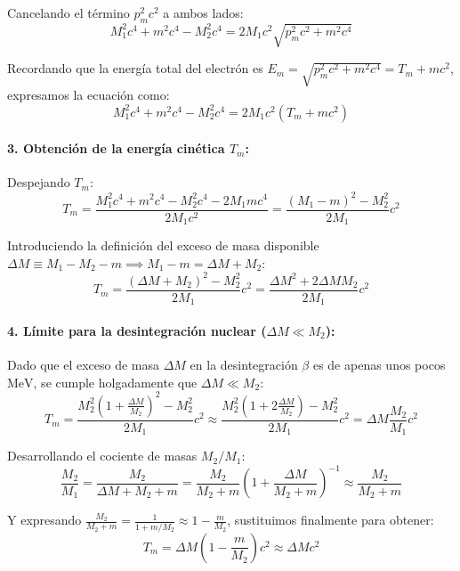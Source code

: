 Cancelando el término $p_m^2 c^2$ a ambos lados:
\begin{equation}
M_1^2 c^4 + m^2 c^4 - M_2^2 c^4 = 2 M_1 c^2 \sqrt{p_m^2 c^2 + m^2 c^4}
\end{equation}

Recordando que la energía total del electrón es $E_m = \sqrt{p_m^2 c^2 + m^2 c^4} = T_m + m c^2$, expresamos la ecuación como:
\begin{equation}
M_1^2 c^4 + m^2 c^4 - M_2^2 c^4 = 2 M_1 c^2 (T_m + m c^2)
\end{equation}

\paragraph{3. Obtención de la energía cinética $T_m$:}
Despejando $T_m$:
\begin{equation}
T_m = \frac{M_1^2 c^4 + m^2 c^4 - M_2^2 c^4 - 2 M_1 m c^4}{2 M_1 c^2} = \frac{(M_1 - m)^2 - M_2^2}{2 M_1} c^2
\end{equation}

Introduciendo la definición del exceso de masa disponible $\Delta M \equiv M_1 - M_2 - m \implies M_1 - m = \Delta M + M_2$:
\begin{equation}
T_m = \frac{(\Delta M + M_2)^2 - M_2^2}{2 M_1} c^2 = \frac{\Delta M^2 + 2 \Delta M M_2}{2 M_1} c^2
\end{equation}

\paragraph{4. Límite para la desintegración nuclear ($\Delta M \ll M_2$):}
Dado que el exceso de masa $\Delta M$ en la desintegración $\beta$ es de apenas unos pocos $\text{MeV}$, se cumple holgadamente que $\Delta M \ll M_2$:
\begin{equation}
T_m = \frac{M_2^2 \left( 1 + \frac{\Delta M}{M_2} \right)^2 - M_2^2}{2 M_1} c^2 \approx \frac{M_2^2 \left( 1 + 2\frac{\Delta M}{M_2} \right) - M_2^2}{2 M_1} c^2 = \Delta M \frac{M_2}{M_1} c^2
\end{equation}

Desarrollando el cociente de masas $M_2 / M_1$:
\begin{equation}
\frac{M_2}{M_1} = \frac{M_2}{\Delta M + M_2 + m} = \frac{M_2}{M_2 + m} \left( 1 + \frac{\Delta M}{M_2 + m} \right)^{-1} \approx \frac{M_2}{M_2 + m}
\end{equation}

Y expresando $\frac{M_2}{M_2 + m} = \frac{1}{1 + m / M_2} \approx 1 - \frac{m}{M_2}$, sustituimos finalmente para obtener:
\begin{equation}
T_m = \Delta M \left( 1 - \frac{m}{M_2} \right) c^2 \approx \Delta M c^2
\end{equation}

